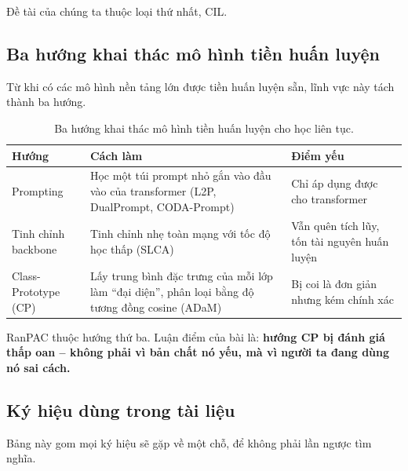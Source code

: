 \documentclass[11pt,a4paper]{article}
\begin{document}
Đề tài của chúng ta thuộc loại thứ nhất, CIL.

\subsection{Ba hướng khai thác mô hình tiền huấn luyện}

Từ khi có các mô hình nền tảng lớn được tiền huấn luyện sẵn, lĩnh vực này tách
thành ba hướng.

\begin{table}[htbp]
\centering
\caption{Ba hướng khai thác mô hình tiền huấn luyện cho học liên tục.}
\label{tab:huong}
\begin{tabular}{@{}p{2.3cm}>{\raggedright\arraybackslash}p{6.0cm}>{\raggedright\arraybackslash}p{6.0cm}@{}}
\toprule
Hướng & Cách làm & Điểm yếu \\
\midrule
Prompting
  & Học một túi prompt nhỏ gắn vào đầu vào của transformer (L2P, DualPrompt,
    CODA-Prompt)
  & Chỉ áp dụng được cho transformer \\
\addlinespace
Tinh chỉnh backbone
  & Tinh chỉnh nhẹ toàn mạng với tốc độ học thấp (SLCA)
  & Vẫn quên tích lũy, tốn tài nguyên huấn luyện \\
\addlinespace
Class-Prototype (CP)
  & Lấy trung bình đặc trưng của mỗi lớp làm ``đại diện'', phân loại bằng độ
    tương đồng cosine (ADaM)
  & Bị coi là đơn giản nhưng kém chính xác \\
\bottomrule
\end{tabular}
\end{table}

RanPAC thuộc hướng thứ ba. Luận điểm của bài là: \textbf{hướng CP bị đánh giá
thấp oan -- không phải vì bản chất nó yếu, mà vì người ta đang dùng nó sai cách.}

\subsection{Ký hiệu dùng trong tài liệu}

Bảng này gom mọi ký hiệu sẽ gặp về một chỗ, để không phải lần ngược tìm nghĩa.
\end{document}
